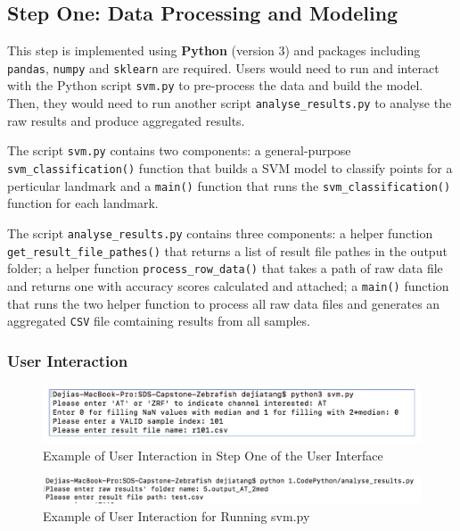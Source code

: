 \documentclass[10pt,letterpaper]{article}
\begin{document}
\subsection{Step One: Data Processing and
Modeling}\label{step-one-data-processing-and-modeling}

This step is implemented using \textbf{Python} (version 3) and packages
including \texttt{pandas}, \texttt{numpy} and \texttt{sklearn} are
required. Users would need to run and interact with the Python script
\texttt{svm.py} to pre-process the data and build the model. Then, they
would need to run another script \texttt{analyse\_results.py} to analyse
the raw results and produce aggregated results.

The script \texttt{svm.py} contains two components: a general-purpose
\texttt{svm\_classification()} function that builds a SVM model to
classify points for a perticular landmark and a \texttt{main()} function
that runs the \texttt{svm\_classification()} function for each landmark.

The script \texttt{analyse\_results.py} contains three components: a
helper function \texttt{get\_result\_file\_pathes()} that returns a list
of result file pathes in the output folder; a helper function
\texttt{process\_row\_data()} that takes a path of raw data file and
returns one with accuracy scores calculated and attached; a
\texttt{main()} function that runs the two helper function to process
all raw data files and generates an aggregated \texttt{CSV} file
comtaining results from all samples.

\subsubsection{User Interaction}\label{user-interaction}

\begin{figure}[h]

{\centering \includegraphics{figures/Figure2} 

}

\caption{Example of User Interaction in Step One of the User Interface}\label{fig:useri}
\end{figure}

\begin{figure}[h]
\includegraphics[width=5.03in]{figures/Figure4} \caption{Example of User Interaction for Running svm.py}\label{fig:useri2}
\end{figure}
\end{document}
